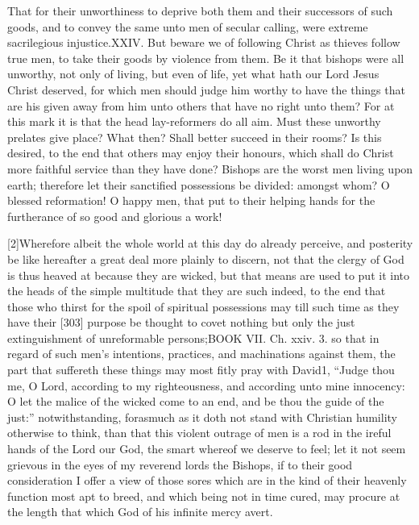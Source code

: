 That for their unworthiness to deprive both them and their successors of such goods, and to convey the same unto men of secular calling, were extreme sacrilegious injustice.XXIV. But beware we of following Christ as thieves follow true men, to take their goods by violence from them. Be it that bishops were all unworthy, not only of living, but even of life, yet what hath our Lord Jesus Christ deserved, for which men should judge him worthy to have the things that are his given away from him unto others that have no right unto them? For at this mark it is that the head lay-reformers do all aim. Must these unworthy prelates give place? What then? Shall better succeed in their rooms? Is this desired, to the end that others may enjoy their honours, which shall do Christ more faithful service than they have done? Bishops are the worst men living upon earth; therefore let their sanctified possessions be divided: amongst whom? O blessed reformation! O happy men, that put to their helping hands for the furtherance of so good and glorious a work!

[2]Wherefore albeit the whole world at this day do already perceive, and posterity be like hereafter a great deal more plainly to discern, not that the clergy of God is thus heaved at because they are wicked, but that means are used to put it into the heads of the simple multitude that they are such indeed, to the end that those who thirst for the spoil of spiritual possessions may till such time as they have their [303] purpose be thought to covet nothing but only the just extinguishment of unreformable persons;BOOK VII. Ch. xxiv. 3. so that in regard of such men’s intentions, practices, and machinations against them, the part that suffereth these things may most fitly pray with David1, “Judge thou me, O Lord, according to my righteousness, and according unto mine innocency: O let the malice of the wicked come to an end, and be thou the guide of the just:” notwithstanding, forasmuch as it doth not stand with Christian humility otherwise to think, than that this violent outrage of men is a rod in the ireful hands of the Lord our God, the smart whereof we deserve to feel; let it not seem grievous in the eyes of my reverend lords the Bishops, if to their good consideration I offer a view of those sores which are in the kind of their heavenly function most apt to breed, and which being not in time cured, may procure at the length that which God of his infinite mercy avert.

